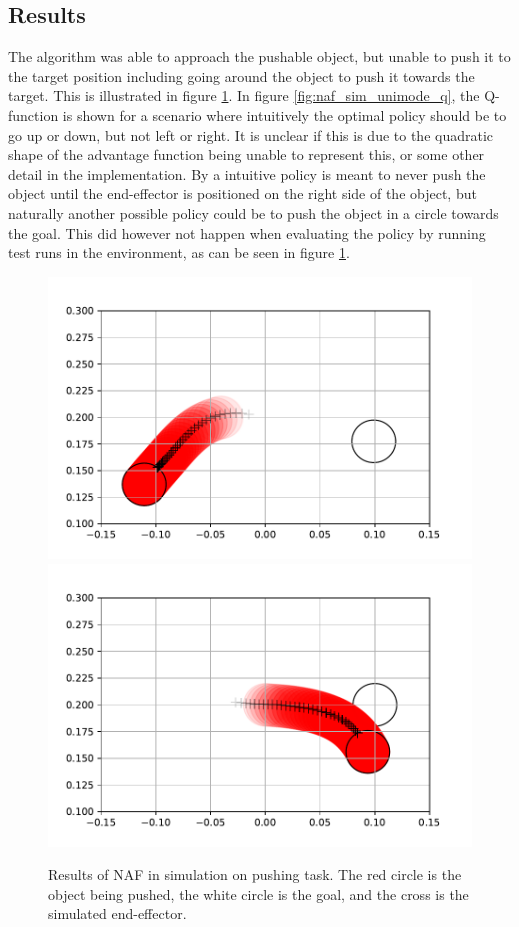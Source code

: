 \subsection{Results}

The algorithm was able to approach the pushable object, but unable to push it
to the target position including going around the object to push it towards the
target. This is illustrated in figure \ref{fig:naf_sim_failure}. In figure
\ref{fig:naf_sim_unimode_q}, the Q-function is shown for a scenario where
intuitively the optimal policy should be to go up or down, but not left or
right. It is unclear if this is due to the quadratic shape of the advantage
function being unable to represent this, or some other detail in the
implementation. By a intuitive policy is meant to never push the object until the end-effector is
positioned on the right side of the object, but naturally another possible policy could be to
push the object in a circle towards the goal. This did however not happen when evaluating the policy
by running test runs in the environment, as can be seen in figure \ref{fig:naf_sim_failure}.

\begin{figure}[h!]
    \centering
    \includegraphics[width=0.4 \textwidth]{res/naf_sim_failure_mode.pdf}
    \includegraphics[width=0.4 \textwidth]{res/naf_sim_failure_mode_ideal.pdf}

    \caption{Results of NAF in simulation on pushing task. The red circle is
    the object being pushed, the white circle is the goal, and the cross is the
    simulated end-effector.}

    \label{fig:naf_sim_failure}
\end{figure}

